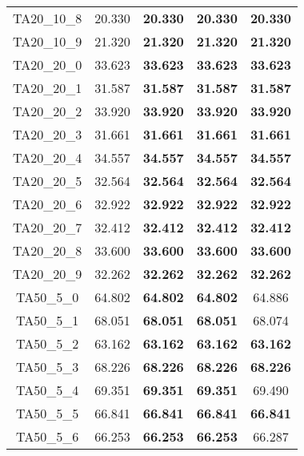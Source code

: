 \begin{tabular}{cc|cc|c}
TA20\_10\_8        & 20.330           & {\bf 20.330}     & {\bf 20.330}     & {\bf 20.330}    \\ 
TA20\_10\_9        & 21.320           & {\bf 21.320}     & {\bf 21.320}     & {\bf 21.320}    \\ 
TA20\_20\_0        & 33.623           & {\bf 33.623}     & {\bf 33.623}     & {\bf 33.623}    \\ 
TA20\_20\_1        & 31.587           & {\bf 31.587}     & {\bf 31.587}     & {\bf 31.587}    \\ 
TA20\_20\_2        & 33.920           & {\bf 33.920}     & {\bf 33.920}     & {\bf 33.920}    \\ 
TA20\_20\_3        & 31.661           & {\bf 31.661}     & {\bf 31.661}     & {\bf 31.661}    \\ 
TA20\_20\_4        & 34.557           & {\bf 34.557}     & {\bf 34.557}     & {\bf 34.557}    \\ 
TA20\_20\_5        & 32.564           & {\bf 32.564}     & {\bf 32.564}     & {\bf 32.564}    \\ 
TA20\_20\_6        & 32.922           & {\bf 32.922}     & {\bf 32.922}     & {\bf 32.922}    \\ 
TA20\_20\_7        & 32.412           & {\bf 32.412}     & {\bf 32.412}     & {\bf 32.412}    \\ 
TA20\_20\_8        & 33.600           & {\bf 33.600}     & {\bf 33.600}     & {\bf 33.600}    \\ 
TA20\_20\_9        & 32.262           & {\bf 32.262}     & {\bf 32.262}     & {\bf 32.262}    \\ 
TA50\_5\_0         & 64.802           & {\bf 64.802}     & {\bf 64.802}     & 64.886          \\ 
TA50\_5\_1         & 68.051           & {\bf 68.051}     & {\bf 68.051}     & 68.074          \\ 
TA50\_5\_2         & 63.162           & {\bf 63.162}     & {\bf 63.162}     & {\bf 63.162}    \\ 
TA50\_5\_3         & 68.226           & {\bf 68.226}     & {\bf 68.226}     & {\bf 68.226}    \\ 
TA50\_5\_4         & 69.351           & {\bf 69.351}     & {\bf 69.351}     & 69.490          \\ 
TA50\_5\_5         & 66.841           & {\bf 66.841}     & {\bf 66.841}     & {\bf 66.841}    \\ 
TA50\_5\_6         & 66.253           & {\bf 66.253}     & {\bf 66.253}     & 66.287          \\ 

\end{tabular}
